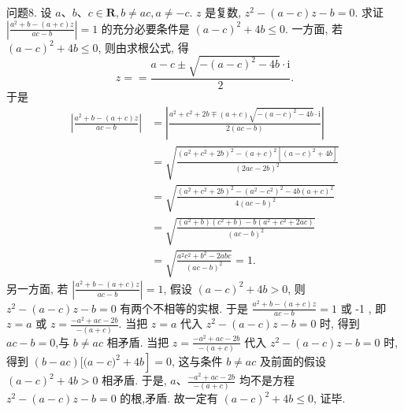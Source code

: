 问题8. 设 $a 、 b 、 c \in \mathbf{R}, b \neq a c, a \neq-c$. $z$ 是复数, $z^2-(a-c) z-b=0$. 求证 $\left|\frac{a^2+b-(a+c) z}{a c-b}\right|=1$ 的充分必要条件是 $(a-c)^2+4 b \leqslant 0$.
一方面, 若 $(a-c)^2+4 b \leqslant 0$, 则由求根公式, 得
$$
z==\frac{a-c \pm \sqrt{-(a-c)^2-4 b} \cdot \mathrm{i}}{2} .
$$
于是
$$
\begin{aligned}
\left|\frac{a^2+b-(a+c) z}{a c-b}\right| & =\left|\frac{a^2+c^2+2 b \mp(a+c) \sqrt{-(a-c)^2-4 b} \cdot \mathrm{i}}{2(a c-b)}\right| \\
& =\sqrt{\frac{\left(a^2+c^2+2 b\right)^2-(a+c)^2\left[(a-c)^2+4 b\right]}{(2 a c-2 b)^2}} \\
& =\sqrt{\frac{\left(a^2+c^2+2 b\right)^2-\left(a^2-c^2\right)^2-4 b(a+c)^2}{4(a c-b)^2}} \\
& =\sqrt{\frac{\left(a^2+b\right)\left(c^2+b\right)-b\left(a^2+c^2+2 a c\right)}{(a c-b)^2}} \\
& =\sqrt{\frac{a^2 c^2+b^2-2 a b c}{(a c-b)^2}}=1 .
\end{aligned}
$$
另一方面, 若 $\left|\frac{a^2+b-(a+c) z}{a c-b}\right|=1$, 假设 $(a-c)^2+4 b>0$, 则 $z^2- (a-c) z-b=0$ 有两个不相等的实根.
于是 $\frac{a^2+b-(a+c) z}{a c-b}=1$ 或 -1 , 即 $z=a$ 或 $z=\frac{-a^2+a c-2 b}{-(a+c)}$.
当把 $z=a$ 代入 $z^2-(a-c) z-b=0$ 时, 得到 $a c-b=0$,与 $b \neq a c$ 相矛盾.
当把 $z=\frac{-a^2+a c-2 b}{-(a+c)}$ 代入 $z^2-(a-c) z-b=0$ 时, 得到 $(b-a c)[(a- \left.c)^2+4 b\right]=0$, 这与条件 $b \neq a c$ 及前面的假设 $(a-c)^2+4 b>0$ 相矛盾.
于是, $a 、 \frac{-a^2+a c-2 b}{-(a+c)}$ 均不是方程 $z^2-(a-c) z-b=0$ 的根,矛盾.
故一定有 $(a-c)^2+4 b \leqslant 0$, 证毕.


